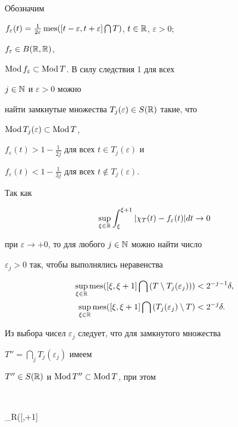 \begin{pf}


Обозначим


$f_\varepsilon(t)=\frac{1}{2\varepsilon}\mes([t-\varepsilon,


t+\varepsilon]\bigcap T)$, $t\in\Bbb R$, $\varepsilon>0$;


$f_\varepsilon\in B(\Bbb R,\Bbb R)$,


$\operatorname{Mod} f_\varepsilon\subset \operatorname{Mod} T$. В силу следствия 1 для всех


$j\in\Bbb N$ и $\varepsilon>0$ можно




найти замкнутые множества $T_j(\varepsilon)\in S(\Bbb R)$ такие, что


$\operatorname{Mod} T_j(\varepsilon)\subset\operatorname{Mod} T$,


$f_\varepsilon(t)>1-\frac{1}{2j}$ для всех $t\in T_j(\varepsilon)$ и


$f_\varepsilon(t)<1-\frac{1}{3j}$ для всех $t\notin T_j(\varepsilon)$.


Так как


$$


\sup_{\xi\in\Bbb R}\int^{\xi+1}_\xi|\chi_T(t)-f_\varepsilon(t)|dt\to 0


$$


при $\varepsilon\to+0$, то для любого $j\in\Bbb N$ можно найти число


$\varepsilon_j>0$ так, чтобы выполнялись неравенства


\begin{align*}


\sup_{\xi\in\Bbb R}\mes([\xi,\xi+1]\bigcap\,


(T\setminus T_j(\varepsilon_j)))&<2^{-j-1}\delta,\\


\sup_{\xi\in\Bbb R}\mes([\xi,\xi+1]\bigcap\,


(T_j(\varepsilon_j)\setminus T)&<2^{-j}\delta.


\end{align*}


Из выбора чисел $\varepsilon_j$ следует, что для замкнутого множества


$T''=\bigcap\limits_j T_j(\varepsilon_j)$ имеем


$T''\in S(\Bbb R)$ и $\operatorname{Mod} T''\subset\operatorname{Mod} T$, при этом


$$


\sup_{\xi\in\Bbb R}\mes([\xi,\xi+1]\bigcap\,



\end{pf}

